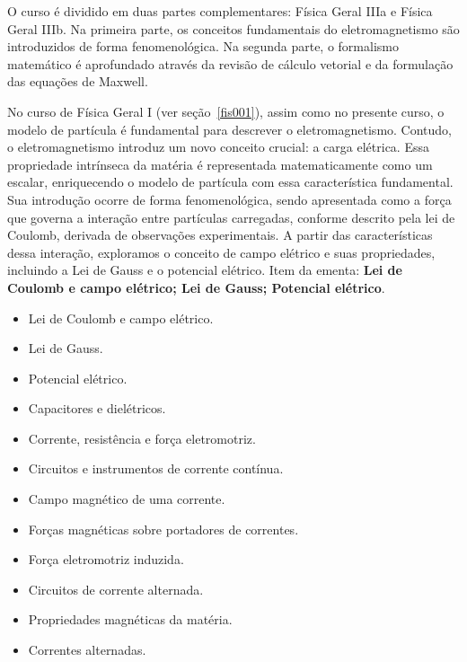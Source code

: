\documentclass[a4paper, 12pt]{article}
\newcounter{fis}
\newcounter{mat}
\begin{document}
O curso é dividido em duas partes complementares: Física Geral IIIa e Física Geral
IIIb. Na primeira parte, os conceitos fundamentais do eletromagnetismo são
introduzidos de forma fenomenológica. Na segunda parte, o formalismo matemático é
aprofundado através da revisão de cálculo vetorial e da formulação das equações de
Maxwell.

No curso de Física Geral I (ver seção~\ref{fis001}), assim como no presente curso, o
modelo de partícula é fundamental para descrever o eletromagnetismo. Contudo, o
eletromagnetismo introduz um novo conceito crucial: a carga elétrica. Essa propriedade
intrínseca da matéria é representada matematicamente como um escalar, enriquecendo o
modelo de partícula com essa característica fundamental. Sua introdução ocorre de forma
fenomenológica, sendo apresentada como a força que governa a interação entre partículas
carregadas, conforme descrito pela lei de Coulomb, derivada de observações
experimentais. A partir das características dessa interação, exploramos o conceito de
campo elétrico e suas propriedades, incluindo a Lei de Gauss e o potencial elétrico.
Item da ementa: {\bf Lei de Coulomb e campo elétrico; Lei de Gauss; Potencial elétrico}.

\begin{tcolorbox}[title=Ementa Física Geral IIIa:]
    \begin{itemize}
        \item Lei de Coulomb e campo elétrico.
        \item Lei de Gauss.
        \item Potencial elétrico.
        \item Capacitores e dielétricos.
        \item Corrente, resistência e força eletromotriz.
        \item Circuitos e instrumentos de corrente contínua.
        \item Campo magnético de uma corrente.
        \item Forças magnéticas sobre portadores de correntes.
        \item Força eletromotriz induzida.
        \item Circuitos de corrente alternada.
        \item Propriedades magnéticas da matéria.
        \item Correntes alternadas.
    \end{itemize}
\end{tcolorbox}
\end{document}
